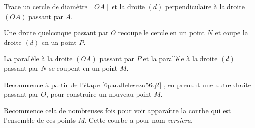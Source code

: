 \begin{myenumerate}
  \item Trace un cercle de diamètre $[OA]$ et la droite $(d)$
    perpendiculaire à la droite $(OA)$ passant par $A$.
  \item\label{6parallelesexo56q2} Une droite quelconque passant par $O$ 
recoupe le cercle en
    un point $N$ et coupe la droite $(d)$ en un point $P$.
  \item La parallèle à la droite $(OA)$ passant par $P$ et la
    parallèle à la droite $(d)$ passant par $N$ se coupent en un point $M$.
  \item Recommence à partir de l'étape \ref{6parallelesexo56q2}
    , en prenant une autre droite passant par $O$, pour construire
    un nouveau point $M$.
\end{myenumerate}
Recommence cela de nombreuses fois pour voir apparaître la courbe qui
est l'ensemble de ces points $M$. Cette courbe a pour nom {\em
  versiera}.
